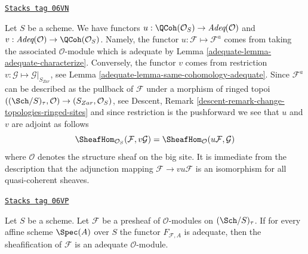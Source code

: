 \begin{remark}[Compare]
\label{adequate-remark-compare}
\href{https://stacks.math.columbia.edu/tag/06VN}{\texttt{Stacks tag 06VN}}

Let $S$ be a scheme. We have functors
$u : \QCoh(\mathcal{O}_S) \to \textit{Adeq}(\mathcal{O})$
and
$v : \textit{Adeq}(\mathcal{O}) \to \QCoh(\mathcal{O}_S)$.
Namely, the functor $u : \mathcal{F} \mapsto \mathcal{F}^a$
comes from taking the associated $\mathcal{O}$-module which is
adequate by
Lemma \ref{adequate-lemma-adequate-characterize}.
Conversely, the functor $v$ comes from restriction
$v : \mathcal{G} \mapsto \mathcal{G}|_{S_{Zar}}$, see
Lemma \ref{adequate-lemma-same-cohomology-adequate}.
Since $\mathcal{F}^a$ can be described as the pullback of
$\mathcal{F}$ under a morphism of ringed topoi
$((\Sch/S)_\tau, \mathcal{O}) \to (S_{Zar}, \mathcal{O}_S)$, see
Descent, Remark \ref{descent-remark-change-topologies-ringed-sites}
and since restriction is the pushforward we see that $u$ and $v$
are adjoint as follows
$$
\SheafHom_{\mathcal{O}_S}(\mathcal{F}, v\mathcal{G})
=
\SheafHom_\mathcal{O}(u\mathcal{F}, \mathcal{G})
$$
where $\mathcal{O}$ denotes the structure sheaf on the big site.
It is immediate from the description that the adjunction mapping
$\mathcal{F} \to vu\mathcal{F}$ is an isomorphism for all quasi-coherent
sheaves.
\end{remark}

\begin{lemma}
\label{adequate-lemma-sheafification-adequate}
\href{https://stacks.math.columbia.edu/tag/06VP}{\texttt{Stacks tag 06VP}}

Let $S$ be a scheme. Let $\mathcal{F}$ be a presheaf of $\mathcal{O}$-modules
on $(\Sch/S)_\tau$. If for every affine scheme
$\Spec(A)$ over $S$ the functor $F_{\mathcal{F}, A}$ is
adequate, then the sheafification of $\mathcal{F}$ is an adequate
$\mathcal{O}$-module.
\end{lemma}

